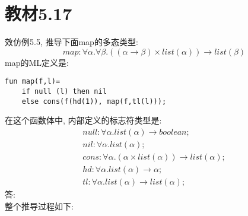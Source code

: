 \documentclass[UTF8]{article}
\begin{document}
\section*{教材5.17}
\noindent 效仿例5.5, 推导下面map的多态类型:
$$map: \forall\alpha.\forall\beta.((\alpha\rightarrow\beta)\times list(\alpha))\rightarrow list(\beta)$$
\noindent map的ML定义是:
\begin{lstlisting}
fun map(f,l)=
	if null (l) then nil
	else cons(f(hd(1)), map(f,tl(l)));
\end{lstlisting}
在这个函数体中, 内部定义的标志符类型是:
$$\begin{array}{l}
	null:\forall\alpha.list(\alpha)\rightarrow boolean;\\
	nil:\forall\alpha.list(\alpha);\\
	cons:\forall\alpha.(\alpha\times list(\alpha))\rightarrow list(\alpha);\\
	hd:\forall\alpha.list(\alpha)\rightarrow\alpha;\\
	tl:\forall\alpha.list(\alpha)\rightarrow list(\alpha);
\end{array}$$
\noindent 答:\\
整个推导过程如下:\\
\end{document}
